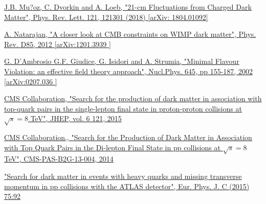 \documentclass[a4paper, 10pt, openright]{report}
\begin{document}
\begin{thebibliography}{1}
\href{https://arxiv.org/abs/1804.01092}{J.B. Mu?oz, C. Dvorkin and A. Loeb,
"21-cm Fluctuations from Charged Dark Matter",
Phys. Rev. Lett. 121, 121301 (2018) [arXiv: 1804.01092]}

\href{https://arxiv.org/abs/1201.3939}{A. Natarajan,
"A closer look at CMB constraints on WIMP dark matter",
Phys. Rev. D85, 2012 [arXiv:1201.3939 ]}

\href{https://arxiv.org/abs/hep-ph/0207036}{G. D'Ambrosio G.F. Giudice, G. Isidori and A. Strumia,
"Minimal Flavour Violation: an effective field theory approach",
Nucl.Phys. 645, pp 155-187, 2002 [arXiv:0207.036 ]}



\href{https://arxiv.org/abs/1504.03198}{CMS Collaboration,
"Search for the production of dark matter in association with top-quark pairs in the single-lepton final state in proton-proton collisions at $\sqrt{s} = 8$ TeV",
JHEP, vol. 6 121, 2015}

\href{http://inspirehep.net/record/1292446}{CMS Collaboration,,
"Search for the Production of Dark Matter in Association with Top Quark Pairs in the Di-lepton Final State in pp collisions at $\sqrt{s} = 8$ TeV",
CMS-PAS-B2G-13-004, 2014}

\href{https://arxiv.org/abs/1410.4031}{
"Search for dark matter in events with heavy quarks and missing transverse momentum in pp collisions with the ATLAS detector",
Eur. Phys. J. C (2015) 75:92}



\end{thebibliography}
\end{document}
